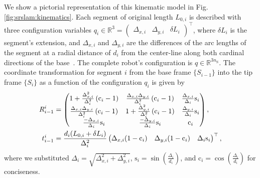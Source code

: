 
We show a pictorial representation of this kinematic model in Fig. \ref{fig:srslam:kinematics}. Each segment of original length $L_{0,i}$ is described with three configuration variables 
%
    $q_i \in \mathbb{R}^{3} = \begin{pmatrix}\Delta_{x,i} & \Delta_{y,i} & \delta L_i\end{pmatrix}^\top$,
where $\delta L_i$ is the segment's extension, and $\Delta_{x,i}$ and $\Delta_{y,i}$ are the differences of the arc lengths of the segment at a radial distance of $d_i$ from the center-line along both cardinal directions of the base~\citep{della2020improved}. The complete robot's configuration is $q \in \mathbb{R}^{3 n_{\mathrm{S}}}$. The coordinate transformation for segment $i$ from the base frame $\{ S_{i-1} \}$ into the tip frame $\{ S_{i} \}$ as a function of the configuration $q_i$ is given by~\citep{della2020improved}
\begin{equation}
\label{eq:srslam:transformation_improved_pcc}
\begin{split}
    R_{i-1}^{i} &= 
    \begin{pmatrix}
        1 + \frac{\Delta_{x,i}^2}{\Delta_{i}^2} \left ( \mathrm{c}_i - 1 \right ) & \frac{\Delta_{x,i} \Delta_{y,i}}{\Delta_{i}^2} \left ( \mathrm{c}_i - 1 \right ) & \frac{\Delta_{x,i}}{\Delta_i} \mathrm{s}_i\\
        \frac{\Delta_{x,i} \Delta_{y,i}}{\Delta_{i}^2} \left ( \mathrm{c}_i - 1 \right ) & 1 + \frac{\Delta_{y,i}^2}{\Delta_{i}^2} \left ( \mathrm{c}_i - 1 \right ) & \frac{\Delta_{y,i}}{\Delta_i} \mathrm{s}_i\\
        \frac{-\Delta_{x,i}}{\Delta_i} \mathrm{s}_i & \frac{-\Delta_{y,i}}{\Delta_i} \mathrm{s}_i & \mathrm{c}_i
    \end{pmatrix},\\
    \vspace{0.25em}
    t_{i-1}^{i} &= \frac{d_i ( L_{0,i}+\delta L_i)}{\Delta_i^2}
    \begin{pmatrix}
        \Delta_{x,i} (1 - \mathrm{c}_i) & \Delta_{y,i} (1 - \mathrm{c}_i) & \Delta_{i} \mathrm{s}_i
    \end{pmatrix}^{\top},
\end{split}
\end{equation}
where we substituted $\Delta_i = \sqrt{\Delta_{x,i}^2 + \Delta_{y,i}^2}$, $\mathrm{s}_i = \sin \left ( \frac{\Delta_i}{d_i} \right )$, and $\mathrm{c}_i = \cos \left ( \frac{\Delta_i}{d_i} \right )$ for conciseness.


